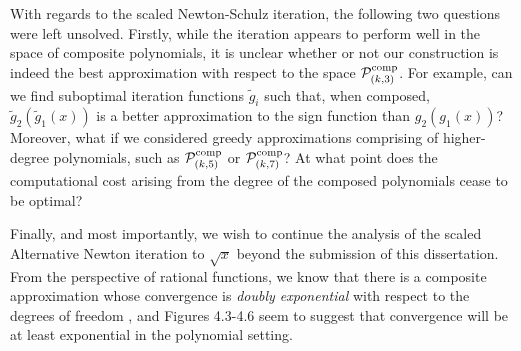\bigskip{}

With regards to the scaled Newton-Schulz iteration, the following two questions were left unsolved. Firstly, while the iteration appears to perform well in the space of composite polynomials, it is unclear whether or not our construction is indeed the best approximation with respect to the space $\mathcal{P}_{(k,3)}^{\text{comp}}$. For example, can we find suboptimal iteration functions $\tilde{g}_i$ such that, when composed, $\tilde{g}_2(\tilde{g}_1(x))$ is a better approximation to the sign function than $g_2(g_1(x))$? Moreover, what if we considered greedy approximations comprising of higher-degree polynomials, such as $\mathcal{P}_{(k,5)}^{\text{comp}}$ or $\mathcal{P}_{(k,7)}^{\text{comp}}$? At what point does the computational cost arising from the degree of the composed polynomials cease to be optimal? 

\bigskip{}

Finally, and most importantly, we wish to continue the analysis of the scaled Alternative Newton iteration to $\sqrt{x}$ beyond the submission of this dissertation. From the perspective of rational functions, we know that there is a composite approximation whose convergence is \textit{doubly exponential} with respect to the degrees of freedom \cite{Yuji}, and Figures 4.3-4.6 seem to suggest that convergence will be at least exponential in the polynomial setting.